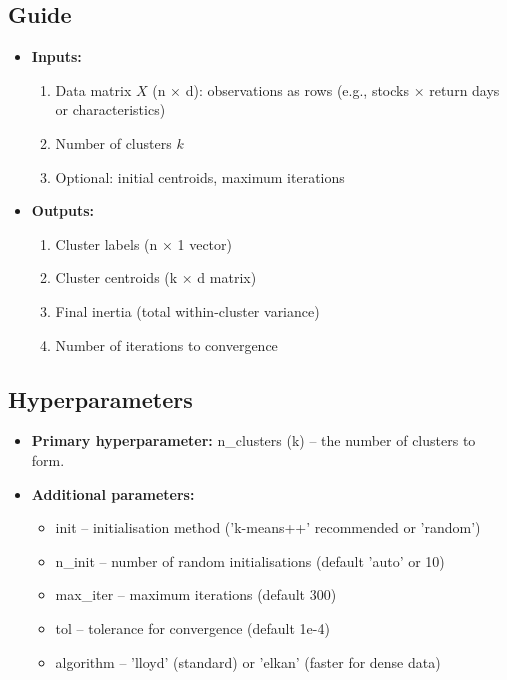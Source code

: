 \documentclass[11pt,a4paper]{article}
\begin{document}
\subsection{Guide}
\begin{itemize}
  \item \textbf{Inputs:}
  \begin{enumerate}
    \item Data matrix \( X \) (n × d): observations as rows (e.g., stocks × return days or characteristics)
    \item Number of clusters \( k \)
    \item Optional: initial centroids, maximum iterations
  \end{enumerate}
  \item \textbf{Outputs:}
  \begin{enumerate}
    \item Cluster labels (n × 1 vector)
    \item Cluster centroids (k × d matrix)
    \item Final inertia (total within-cluster variance)
    \item Number of iterations to convergence
  \end{enumerate}
\end{itemize}



\subsection{Hyperparameters}
\begin{itemize}
  \item \textbf{Primary hyperparameter:} n\_clusters (k) – the number of clusters to form.
  \item \textbf{Additional parameters:}
  \begin{itemize}
    \item init – initialisation method ('k-means++' recommended or 'random')
    \item n\_init – number of random initialisations (default 'auto' or 10)
    \item max\_iter – maximum iterations (default 300)
    \item tol – tolerance for convergence (default 1e-4)
    \item algorithm – 'lloyd' (standard) or 'elkan' (faster for dense data)
  \end{itemize}
\end{itemize}
\end{document}
